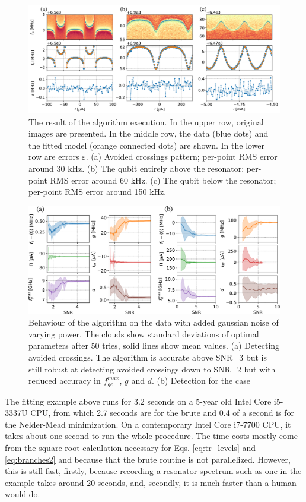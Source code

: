 \documentclass[%
 aip,
 amsmath,amssymb,
 reprint,%
]{revtex4-1}
\begin{document}
\begin{figure}
	\centering
	\includegraphics[width=\linewidth]{fit_cases}
	\caption{The result of the algorithm execution. In the upper row, original images are presented. In the middle row, the data  (blue dots) and the fitted model (orange connected dots) are shown. In the lower row are errors $\varepsilon$. (a) Avoided crossings pattern; per-point RMS error around 30 kHz. (b) The qubit entirely above the resonator; per-point RMS error around 60 kHz. (c) The qubit below the resonator; per-point RMS error around 150 kHz.}
	\label{fig:anti_fit_cases}
\end{figure}

\begin{figure}
	\centering
	\includegraphics[width=.9\linewidth]{noise_test}
	\caption{Behaviour of the algorithm on the data with added gaussian noise of varying power. The clouds show standard deviations of optimal parameters after 50 tries, solid lines show mean values. (a) Detecting avoided crossings. The algorithm is accurate above SNR=3 but is still robust at detecting avoided crossings down to SNR=2 but with reduced accuracy in $f_{ge}^{max}$, $g$ and $d$. (b) Detection for the case}
	\label{fig:noise_test}
\end{figure}
The fitting example above runs for 3.2 seconds on a 5-year old Intel Core i5-3337U CPU, from which 2.7 seconds are for the brute and 0.4 of a second is for the Nelder-Mead minimization. On a contemporary Intel Core i7-7700 CPU, it takes about one second to run the whole procedure. The time costs mostly come from the square root calculation necessary for Eqs. \eqref{eq:tr_levels} and \eqref{eq:branches2} and because that the brute routine is not parallelized. However, this is still fast, firstly, because recording a resonator spectrum such as one in the example takes around 20 seconds, and, secondly, it is much faster than a human would do. 
\end{document}
